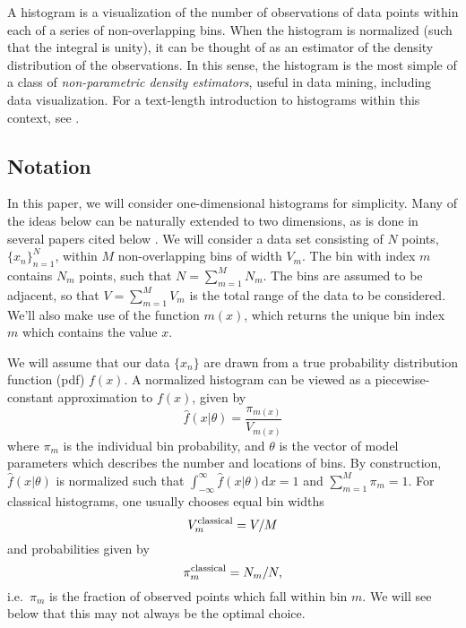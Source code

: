 \documentclass[12pt]{article}
\newcommand{\dd}{\mathrm{d}}
\begin{document}
A histogram is a visualization of the number of observations of data points
within each of a series of non-overlapping bins.  When the histogram is
normalized (such that the integral is unity), it can be thought of as an
estimator of the density distribution of the observations.
In this sense, the histogram is the most simple of a class of
{\it non-parametric density estimators}, useful in data mining, including
data visualization.  For a text-length introduction to histograms within
this context, see \citet{Scott1992}.

\subsection{Notation}
In this paper, we will consider one-dimensional histograms for simplicity.
Many of the ideas below can be naturally extended to two dimensions, as is
done in several papers cited below \citep[see, e.g.][]{Hogg2008, Knuth2006}.
We will consider a data set consisting of $N$ points, $\{x_n\}_{n=1}^{N}$,
within $M$ non-overlapping bins of width $V_m$.  The bin with index
$m$ contains $N_m$ points, such that $N = \sum_{m=1}^M N_m$.  The bins are
assumed to be adjacent, so that $V = \sum_{m=1}^M V_m$ is the total range
of the data to be considered.  We'll also make use of the function
$m(x)$, which returns the unique bin index $m$ which contains the value $x$.

We will assume that our data $\{x_n\}$ are drawn from a true probability
distribution function (pdf) $f(x)$.  A normalized histogram can be viewed
as a piecewise-constant approximation to $f(x)$, given by
\begin{equation}
  \label{eq:hist_pdf}
  \hat{f}(x|\theta) = \frac{\pi_{m(x)}}{V_{m(x)}}
\end{equation}
where $\pi_m$ is the individual bin probability, and $\theta$ is the vector
of model parameters which describes the number and locations of bins.
By construction, $\hat{f}(x|\theta)$ is normalized such that
$\int_{-\infty}^\infty \hat{f}(x|\theta)\dd x = 1$ and $\sum_{m=1}^M \pi_m = 1$.
For classical histograms, one usually chooses equal bin widths
\begin{equation}
  V_m^{\rm classical} =  V/M
\end{equation}
 and probabilities given by
\begin{equation}
  \pi_m^{\rm classical} = N_m / N,
\end{equation}
i.e.\ $\pi_m$ is the fraction of observed points which fall within bin $m$.
We will see below that this may not always be the optimal choice.
\end{document}
